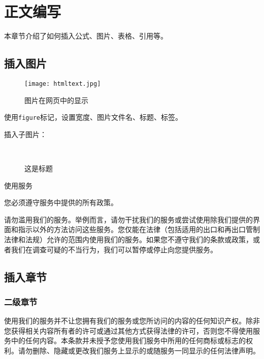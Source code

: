 \chapter{正文编写}

本章节介绍了如何插入公式、图片、表格、引用等。

\section{插入图片}

\begin{figure}[htbp]
\centering
\texttt{[image: htmltext.jpg]}
\caption{图片在网页中的显示}
\label{FIGhtmltext}
\end{figure}

使用\verb|figure|标记，设置宽度、图片文件名、标题、标签。

插入子图片：

\begin{figure}[htbp]
\centering
{}
~~
~~
\caption{这是标题}
\label{thisiisalabel}
\end{figure}

使用服务

您必须遵守服务中提供的所有政策。

请勿滥用我们的服务。举例而言，请勿干扰我们的服务或尝试使用除我们提供的界面和指示以外的方法访问这些服务。您仅能在法律（包括适用的出口和再出口管制法律和法规）允许的范围内使用我们的服务。如果您不遵守我们的条款或政策，或者我们在调查可疑的不当行为，我们可以暂停或停止向您提供服务。

\section{插入章节}

\subsection{二级章节}

使用我们的服务并不让您拥有我们的服务或您所访问的内容的任何知识产权。除非您获得相关内容所有者的许可或通过其他方式获得法律的许可，否则您不得使用服务中的任何内容。本条款并未授予您使用我们服务中所用的任何商标或标志的权利。请勿删除、隐藏或更改我们服务上显示的或随服务一同显示的任何法律声明。

